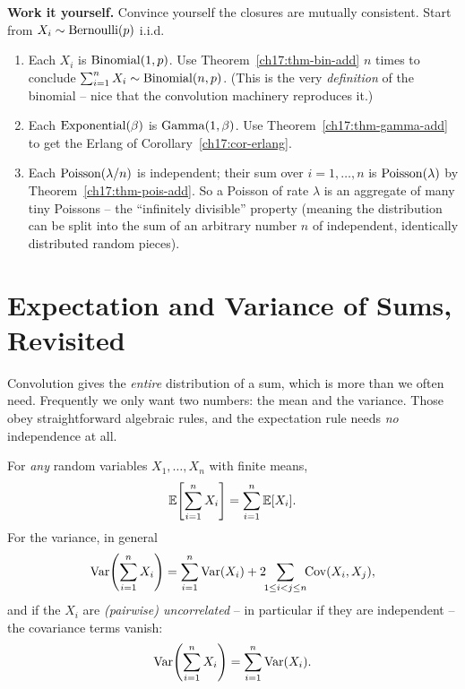 \begin{labbox}
\textbf{Work it yourself.} Convince yourself the closures are mutually
consistent. Start from $X_i\sim\operatorname{Bernoulli}(p)$ i.i.d.
\begin{enumerate}
  \item Each $X_i$ is $\operatorname{Binomial}(1,p)$. Use Theorem~\ref{ch17:thm-bin-add}
        $n$ times to conclude $\sum_{i=1}^n X_i\sim\operatorname{Binomial}(n,p)$. (This is
        the very \emph{definition} of the binomial -- nice that the
        convolution machinery reproduces it.)
  \item Each $\operatorname{Exponential}(\beta)$ is $\operatorname{Gamma}(1,\beta)$. Use
        Theorem~\ref{ch17:thm-gamma-add} to get the Erlang of
        Corollary~\ref{ch17:cor-erlang}.
  \item Each $\operatorname{Poisson}(\lambda/n)$ is independent; their sum over $i=1,\dots,n$
        is $\operatorname{Poisson}(\lambda)$ by Theorem~\ref{ch17:thm-pois-add}. So a
        Poisson of rate $\lambda$ is an aggregate of many tiny Poissons --
        the ``infinitely divisible'' property (meaning the distribution
        can be split into the sum of an arbitrary number $n$ of independent,
        identically distributed random pieces).
\end{enumerate}
\end{labbox}

\section{Expectation and Variance of Sums, Revisited}
\label{ch17:mean-var}

Convolution gives the \emph{entire} distribution of a sum, which is more
than we often need. Frequently we only want two numbers: the mean and the
variance. Those obey straightforward algebraic rules, and
the expectation rule needs \emph{no} independence at all.

\begin{theorem}
\label{ch17:thm-mean-var}
For \emph{any} random variables $X_1,\dots,X_n$ with finite means,
\[
\operatorname{\mathbb{E}}\!\left[\sum_{i=1}^n X_i\right] = \sum_{i=1}^n \operatorname{\mathbb{E}}[X_i].
\]
For the variance, in general
\[
\operatorname{Var}\!\left(\sum_{i=1}^n X_i\right)
  = \sum_{i=1}^n \operatorname{Var}(X_i) + 2\!\!\sum_{1\le i<j\le n}\!\! \operatorname{Cov}(X_i,X_j),
\]
and if the $X_i$ are \emph{(pairwise) uncorrelated} -- in particular if
they are independent -- the covariance terms vanish:
\[
\operatorname{Var}\!\left(\sum_{i=1}^n X_i\right) = \sum_{i=1}^n \operatorname{Var}(X_i).
\]
\end{theorem}

